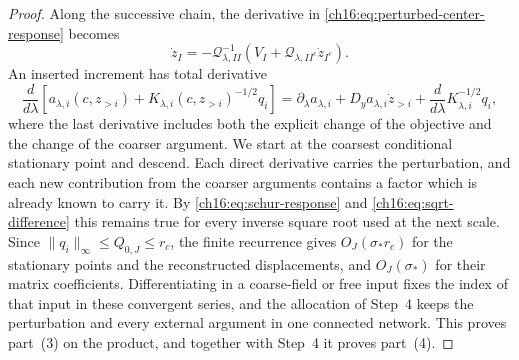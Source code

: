 \begin{proof}
Along the successive chain, the derivative in \eqref{ch16:eq:perturbed-center-response} becomes
\[
 \dot z_I=-\mathcal Q_{\lambda,II}^{-1}
               (V_I+\mathcal Q_{\lambda,II^c}\dot z_{I^c}).
\]
An inserted increment has total derivative
\[
 \frac{d}{d\lambda}
 [a_{\lambda,i}(c,z_{>i})+K_{\lambda,i}(c,z_{>i})^{-1/2}q_i]
 =\partial_\lambda a_{\lambda,i}
     +D_ya_{\lambda,i}\dot z_{>i}
     +\frac{d}{d\lambda}K_{\lambda,i}^{-1/2}q_i,
\]
where the last derivative includes both the explicit change of the objective and the change of the coarser argument. We start at the coarsest conditional stationary point and descend. Each direct derivative carries the perturbation, and each new contribution from the coarser arguments contains a factor which is already known to carry it. By \eqref{ch16:eq:schur-response} and \eqref{ch16:eq:sqrt-difference} this remains true for every inverse square root used at the next scale. Since $\|q_i\|_\infty\le Q_{0,J}\le r_c$, the finite recurrence gives $O_J(\sigma_*r_c)$ for the stationary points and the reconstructed displacements, and $O_J(\sigma_*)$ for their matrix coefficients. Differentiating in a coarse-field or free input fixes the index of that input in these convergent series, and the allocation of Step~4 keeps the perturbation and every external argument in one connected network. This proves part~(3) on the product, and together with Step~4 it proves part~(4).


\end{proof}
